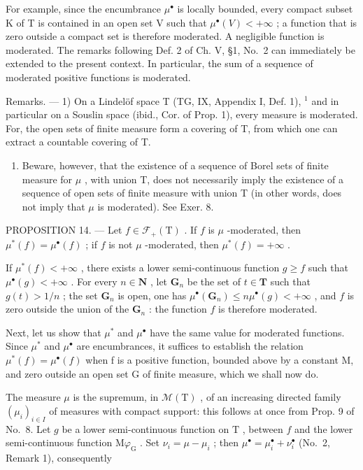 For example, since the encumbrance \(\mu^{\bullet}\) is locally bounded, every compact subset K of T is contained in an open set V such that \(\mu^{\bullet}(V)<+\infty\) ; a function that is zero outside a compact set is therefore moderated. A negligible function is moderated. The remarks following Def. 2 of Ch. V, §1, No.~2 can immediately be extended to the present context. In particular, the sum of a sequence of moderated positive functions is moderated.

Remarks. --- 1) On a Lindelöf space T (TG, IX, Appendix I, Def. 1), \(^{1}\) and in particular on a Souslin space (ibid., Cor. of Prop. 1), every measure is moderated. For, the open sets of finite measure form a covering of T, from which one can extract a countable covering of T.

\begin{enumerate}
\def\labelenumi{\arabic{enumi})}
\setcounter{enumi}{1}
\tightlist
\item
  Beware, however, that the existence of a sequence of Borel sets of finite measure for \(\mu\) , with union T, does not necessarily imply the existence of a sequence of open sets of finite measure with union T (in other words, does not imply that \(\mu\) is moderated). See Exer. 8.
\end{enumerate}

PROPOSITION 14. --- Let \(f \in \mathcal{F}_{+}(\mathrm{T})\) . If \(f\) is \(\mu\) -moderated, then \(\mu^{*}(f) = \mu^{\bullet}(f)\) ; if \(f\) is not \(\mu\) -moderated, then \(\mu^{*}(f) = +\infty\) .

If \(\mu^{*}(f) < +\infty\) , there exists a lower semi-continuous function \(g \geqslant f\) such that \(\mu^{\bullet}(g) < +\infty\) . For every \(n \in \mathbf{N}\) , let \(\mathbf{G}_{n}\) be the set of \(t \in \mathbf{T}\) such that \(g(t) > 1/n\) ; the set \(\mathbf{G}_{n}\) is open, one has \(\mu^{\bullet}(\mathbf{G}_{n}) \leqslant n\mu^{\bullet}(g) < +\infty\) , and \(f\) is zero outside the union of the \(\mathbf{G}_{n}\) : the function \(f\) is therefore moderated.

Next, let us show that \(\mu^{*}\) and \(\mu^{\bullet}\) have the same value for moderated functions. Since \(\mu^{*}\) and \(\mu^{\bullet}\) are encumbrances, it suffices to establish the relation \(\mu^{*}(f)=\mu^{\bullet}(f)\) when f is a positive function, bounded above by a constant M, and zero outside an open set G of finite measure, which we shall now do.

The measure \(\mu\) is the supremum, in \(\mathcal{M}(\mathrm{T})\) , of an increasing directed family \((\mu_i)_{i\in I}\) of measures with compact support: this follows at once from Prop. 9 of No.~8. Let \(g\) be a lower semi-continuous function on \(\mathrm{T}\) , between \(f\) and the lower semi-continuous function \(\mathrm{M}\varphi_{\mathrm{G}}\) . Set \(\nu_i = \mu - \mu_i\) ; then \(\mu^{\bullet} = \mu_i^{\bullet} + \nu_i^{\bullet}\) (No.~2, Remark 1), consequently

